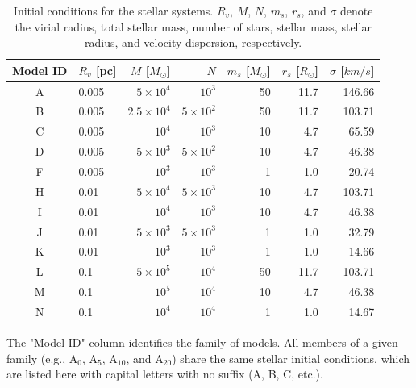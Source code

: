 \begin{table}[!ht]
	\centering
	\begin{threeparttable}
		\begin{tabular}{clrrrrr}
			\hline
			\rowcolor[gray]{0.8}
			\textbf{Model ID}\tnote{1} & $R_v$ [pc] & $M$ [$M_\odot$] & $N$ & $m_s$ [$M_\odot$] & $r_s$ [$R_\odot$] & $\sigma$ [$km/s$]\\
			\hline

			A & 0.005  & $5 \times 10^4$  & $10^3$  & 50  & 11.7  & 146.66 \\
			
			B & 0.005  & $2.5 \times 10^4$  & $5 \times 10^2$  & 50  & 11.7  & 103.71 \\
			
			C & 0.005  & $10^4$  & $10^3$  & 10  & 4.7  & 65.59 \\

			D & 0.005  & $5 \times 10^3$  & $5 \times 10^2$  & 10  & 4.7  & 46.38 \\

			F & 0.005  & $10^3$  & $10^3$  & 1  & 1.0  & 20.74 \\

			H & 0.01  & $5 \times 10^4$  & $5 \times 10^3$  & 10  & 4.7  & 103.71 \\

			I & 0.01  & $10^4$  & $10^3$  & 10  & 4.7  & 46.38 \\

			J & 0.01  & $5 \times 10^3$  & $5 \times 10^3$  & 1  & 1.0  & 32.79 \\

			K & 0.01  & $10^3$  & $10^3$  & 1  & 1.0  & 14.66 \\

			L & 0.1  & $5 \times 10^5$  & $10^4$  & 50  & 11.7  & 103.71 \\

			M & 0.1  & $10^5$  & $10^4$  & 10  & 4.7  & 46.38 \\

			N & 0.1  & $10^4$  & $10^4$  & 1  & 1.0  & 14.67 \\
	        \end{tabular}
	        
	        \begin{tablenotes}
	        	\item[1] The "Model ID" column identifies the family of models. All members of a given family (e.g., A$_0$, A$_5$, A$_{10}$, and A$_{20}$) share the same stellar initial conditions, which are listed here with capital letters with no suffix (A, B, C, etc.).
	        \end{tablenotes}
        \end{threeparttable}
        \caption{Initial conditions for the stellar systems. $R_v$, $M$, $N$, $m_s$, $r_s$, and $\sigma$ denote the virial radius, total stellar mass, number of stars, stellar mass, stellar radius, and velocity dispersion, respectively.}
        \label{tab:4.1_models_IC}
\end{table}

